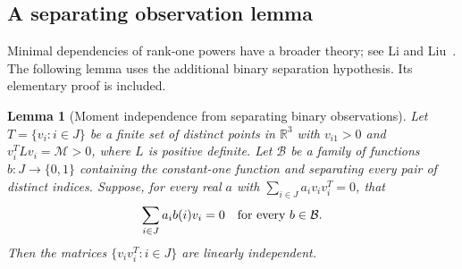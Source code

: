 \documentclass[11pt]{article}
\newtheorem{lemma}[theorem]{Lemma}
\theoremstyle{remark}\newtheorem{remark}[theorem]{Remark}
\newcommand{\R}{\mathbb R}
\numberwithin{equation}{section}
\begin{document}
\subsection{A separating observation lemma}
Minimal dependencies of rank-one powers have a broader theory; see
Li and Liu~\cite{LiLiu}. The following lemma uses the additional binary
separation hypothesis. Its elementary proof is included.
\begin{lemma}[Moment independence from separating binary observations]\label{binary}
Let $T=\{v_i:i\in J\}$ be a finite set of distinct points in $\R^3$ with
$v_{i1}>0$ and $v_i^TLv_i=\mathcal M>0$, where $L$ is positive definite.
Let $\mathcal B$ be a family of functions $b:J\to\{0,1\}$ containing the
constant-one function and separating every pair of distinct indices.
Suppose, for every real $a$ with $\sum_{i\in J}a_iv_iv_i^T=0$, that
\begin{equation}
 \sum_{i\in J}a_i b(i)v_i=0\quad\hbox{for every }b\in\mathcal B. \label{obs}
\end{equation}
Then the matrices $\{v_iv_i^T:i\in J\}$ are linearly independent.
\end{lemma}
\end{document}

